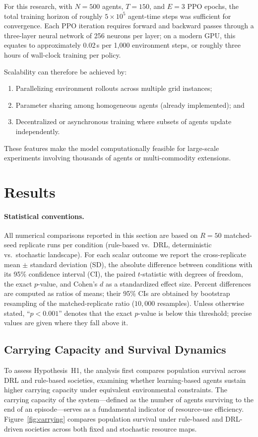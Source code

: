 \documentclass[pdflatex,sn-mathphys-num]{sn-jnl}%
\theoremstyle{thmstyleone}%
\theoremstyle{thmstyletwo}%
\theoremstyle{thmstylethree}%
\begin{document}
For this research, with \(N=500\) agents, \(T=150\), and \(E=3\) PPO epochs, the total training horizon of roughly \(5\times10^{5}\) agent-time steps was sufficient for convergence.  
Each PPO iteration requires forward and backward passes through a three-layer neural network of 256 neurons per layer; on a modern GPU, this equates to approximately 0.02\,s per 1{,}000 environment steps, or roughly three hours of wall-clock training per policy.

Scalability can therefore be achieved by:
\begin{enumerate}
    \item Parallelizing environment rollouts across multiple grid instances;
    \item Parameter sharing among homogeneous agents (already implemented); and
    \item Decentralized or asynchronous training where subsets of agents update independently.
\end{enumerate}
These features make the model computationally feasible for large-scale experiments involving thousands of agents or multi-commodity extensions.


\section{Results}
\label{sec:results}

\paragraph{Statistical conventions.}
All numerical comparisons reported in this section are based on $R = 50$ matched-seed replicate runs per condition (rule-based vs.\ DRL, deterministic vs.\ stochastic landscape).  
For each scalar outcome we report the cross-replicate mean $\pm$ standard deviation (SD), the absolute difference between conditions with its 95\% confidence interval (CI), the paired $t$-statistic with degrees of freedom, the exact $p$-value, and Cohen's $d$ as a standardized effect size.
Percent differences are computed as ratios of means; their 95\% CIs are obtained by bootstrap resampling of the matched-replicate ratio ($10{,}000$ resamples).  
Unless otherwise stated, ``$p < 0.001$'' denotes that the exact $p$-value is below this threshold; precise values are given where they fall above it.

\subsection{Carrying Capacity and Survival Dynamics}
To assess Hypothesis~H1, the analysis first compares population survival across DRL and rule-based societies, examining whether learning-based agents sustain higher carrying capacity under equivalent environmental constraints.
The carrying capacity of the system---defined as the number of agents surviving to the end of an episode---serves as a fundamental indicator of resource-use efficiency.  
Figure~\ref{fig:carrying} compares population survival under rule-based and DRL-driven societies across both fixed and stochastic resource maps.
\end{document}
